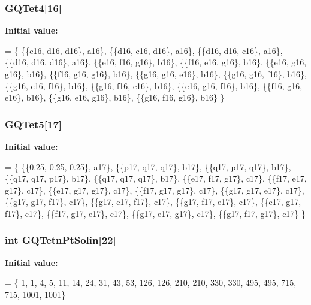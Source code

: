 \subsubsection[{G\-Q\-Tet4}]{ G\-Q\-Tet4[16]}\label{GaussQuadratureTet_8cc_a5b7439b2b3749cc443fa83f6e9ac5e99}
{\bfseries Initial value\-:}
\begin{DoxyCode}
= \{
  \{\{c16, d16, d16\}, a16\},
  \{\{d16, c16, d16\}, a16\},
  \{\{d16, d16, c16\}, a16\},
  \{\{d16, d16, d16\}, a16\},
  \{\{e16, f16, g16\}, b16\},
  \{\{f16, e16, g16\}, b16\},
  \{\{e16, g16, g16\}, b16\},
  \{\{f16, g16, g16\}, b16\},
  \{\{g16, g16, e16\}, b16\},
  \{\{g16, g16, f16\}, b16\},
  \{\{g16, e16, f16\}, b16\},
  \{\{g16, f16, e16\}, b16\},
  \{\{e16, g16, f16\}, b16\},
  \{\{f16, g16, e16\}, b16\},
  \{\{g16, e16, g16\}, b16\},
  \{\{g16, f16, g16\}, b16\}
\}
\end{DoxyCode}
\subsubsection[{G\-Q\-Tet5}]{ G\-Q\-Tet5[17]}\label{GaussQuadratureTet_8cc_abef498fd596d98bea36ede7150978fcf}
{\bfseries Initial value\-:}
\begin{DoxyCode}
= \{
  \{\{0.25, 0.25, 0.25\}, a17\},
  \{\{p17, q17, q17\}, b17\},
  \{\{q17, p17, q17\}, b17\},
  \{\{q17, q17, p17\}, b17\},
  \{\{q17, q17, q17\}, b17\},
  \{\{e17, f17, g17\}, c17\},
  \{\{f17, e17, g17\}, c17\},
  \{\{e17, g17, g17\}, c17\},
  \{\{f17, g17, g17\}, c17\},
  \{\{g17, g17, e17\}, c17\},
  \{\{g17, g17, f17\}, c17\},
  \{\{g17, e17, f17\}, c17\},
  \{\{g17, f17, e17\}, c17\},
  \{\{e17, g17, f17\}, c17\},
  \{\{f17, g17, e17\}, c17\},
  \{\{g17, e17, g17\}, c17\},
  \{\{g17, f17, g17\}, c17\}
\}
\end{DoxyCode}
\subsubsection[{G\-Q\-Tetn\-Pt\-Solin}]{\setlength{\rightskip}{0pt plus 5cm}int G\-Q\-Tetn\-Pt\-Solin[22]}\label{GaussQuadratureTet_8cc_a662baff69aa48fe87ffe30d450d045ff}
{\bfseries Initial value\-:}
\begin{DoxyCode}
= \{
  1,
  1,
  4,
  5,
  11,
  14,
  24,
  31,
  43,
  53,
  126,
  126,
  210,
  210,
  330,
  330,
  495,
  495,
  715,
  715,
  1001,
  1001\}
\end{DoxyCode}
